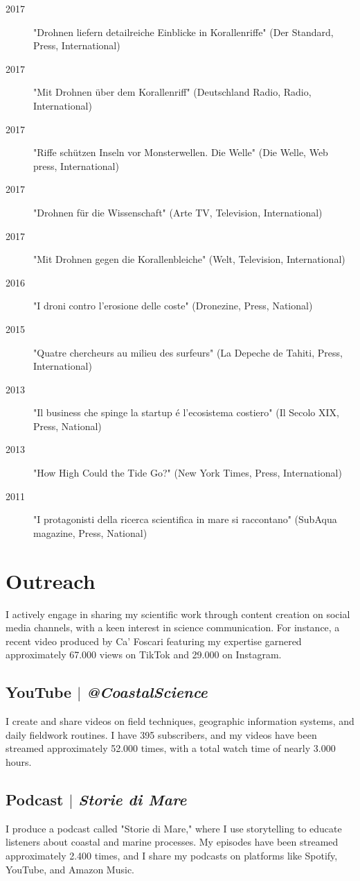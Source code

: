 \documentclass[11pt]{article}
\begin{document}
{\begin{description}
  \item [2017] "Drohnen liefern detailreiche Einblicke in Korallenriffe" (Der Standard, Press, International) 
  \item [2017] "Mit Drohnen über dem Korallenriff" (Deutschland Radio, Radio, International) 
  \item [2017] "Riffe schützen Inseln vor Monsterwellen. Die Welle" (Die Welle, Web press, International) 
  \item [2017] "Drohnen für die Wissenschaft" (Arte TV, Television, International) 
  \item [2017] "Mit Drohnen gegen die Korallenbleiche" (Welt, Television, International) 
  \item [2016] "I droni contro l’erosione delle coste" (Dronezine, Press, National) 
  \item [2015] "Quatre chercheurs au milieu des surfeurs" (La Depeche de Tahiti, Press, International) 
  \item [2013] "Il business che spinge la startup é l’ecosistema costiero" (Il Secolo XIX, Press, National) 
  \item [2013] "How High Could the Tide Go?" (New York Times, Press, International) 
  \item [2011] "I protagonisti della ricerca scientifica in mare si raccontano" (SubAqua magazine, Press, National) 
\end{description}}

\section{Outreach}
{\normalfont I actively engage in sharing my scientific work through content creation on social media channels, with a keen interest in science communication. For instance, a recent video produced by Ca' Foscari featuring my expertise garnered approximately 67.000 views on TikTok and 29.000 on Instagram.}
\bigskip

\bigskip
\subsection{YouTube  $|$ {\normalfont\textit{@CoastalScience}}}
{\footnotesize I create and share videos on field techniques, geographic information systems, and daily fieldwork routines. I have 395 subscribers, and my videos have been streamed approximately 52.000 times, with a total watch time of nearly 3.000 hours.}
\bigskip

\subsection{Podcast  $|$ {\normalfont\textit{Storie di Mare}}}
{\footnotesize I produce a podcast called "Storie di Mare," where I use storytelling to educate listeners about coastal and marine processes. My episodes have been streamed approximately 2.400 times, and I share my podcasts on platforms like Spotify, YouTube, and Amazon Music.}
\bigskip
\end{document}
